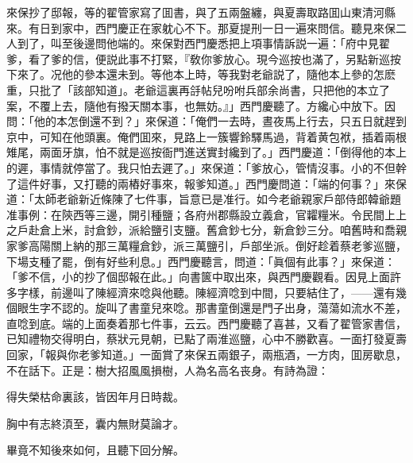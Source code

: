 來保抄了邸報，等的翟管家寫了囬書，與了五兩盤纏，與夏壽取路囬山東清河縣來。有日到家中，西門慶正在家躭心不下。那夏提刑一日一遍來問信。聽見來保二人到了，叫至後邊問他端的。來保對西門慶悉把上項事情訴説一遍：「府中見翟爹，看了爹的信，便説此事不打緊，『敎你爹放心。現今巡按也滿了，另點新巡按下來了。况他的參本還未到。等他本上時，等我對老爺説了，隨他本上參的怎麽重，只批了「該部知道」。老爺這裏再㧱帖兒吩咐兵部余尚書，只把他的本立了案，不覆上去，隨他有撥天關本事，也無妨。』」西門慶聽了。方纔心中放下。因問：「他的本怎倒還不到？」來保道：「俺們一去時，晝夜馬上行去，只五日就趕到京中，可知在他頭裏。俺們囬來，見路上一簇響鈴驛馬過，背着黄包袱，插着兩根雉尾，兩面牙旗，怕不就是巡按衙門進送實封纔到了。」西門慶道：「倒得他的本上的遲，事情就停當了。我只怕去遲了。」來保道：「爹放心，管情沒事。小的不但幹了這件好事，又打聽的兩樁好事來，報爹知道。」西門慶問道：「端的何事？」來保道：「太師老爺新近條陳了七件事，旨意已是准行。如今老爺親家戶部侍郎韓爺題准事例：在陝西等三邊，開引種鹽；各府州郡縣設立義倉，官糶糧米。令民間上上之戶赴倉上米，討倉鈔，派給鹽引支鹽。舊倉鈔七分，新倉鈔三分。咱舊時和喬親家爹高陽關上納的那三萬糧倉鈔，派三萬鹽引，戶部坐派。倒好趁着蔡老爹巡鹽，下場支種了罷，倒有好些利息。」西門慶聽言，問道：「眞個有此事？」來保道：「爹不信，小的抄了個邸報在此。」向書篋中取出來，與西門慶觀看。因見上面許多字樣，前邊叫了陳經濟來唸與他聽。陳經濟唸到中間，只要結住了，——還有幾個眼生字不認的。旋叫了書童兒來唸。那書童倒還是門子出身，蕩蕩如流水不差，直唸到底。端的上面奏着那七件事，云云。西門慶聽了喜甚，又看了翟管家書信，已知禮物交得明白，蔡狀元見朝，已點了兩淮巡鹽，心中不勝歡喜。一面打發夏壽回家，「報與你老爹知道。」一面賞了來保五兩銀子，兩瓶酒，一方肉，囬房歇息，不在話下。正是：樹大招風風損樹，人為名高名丧身。有詩為證：

\begin{myquote}
得失榮枯命裏該，皆因年月日時裁。

胸中有志終湏至，囊内無財莫論才。
\end{myquote}

畢竟不知後來如何，且聽下回分解。

